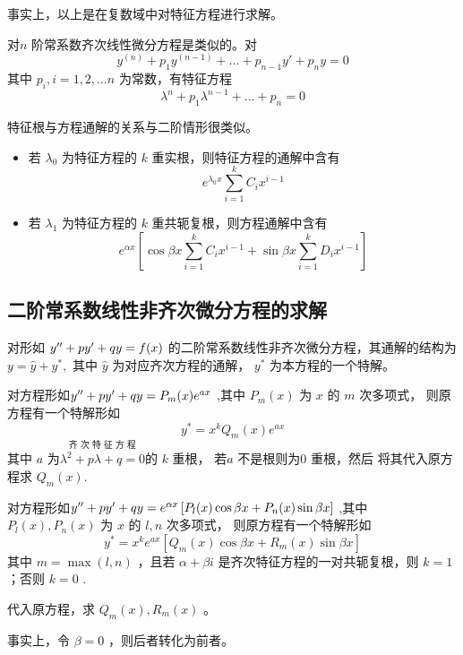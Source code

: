 事实上，以上是在复数域中对特征方程进行求解。

对$ n $ 阶常系数齐次线性微分方程是类似的。对 $$
    y^{(n)} + p_1y^{(n-1)} + \dots + p_{n-1}y' + p_ny = 0
$$ 其中 $ p_i,i=1,2,\dots n  $ 为常数，有特征方程$$
    \lambda^n + p_1\lambda^{n-1} +\dots + p_n = 0
$$ 

特征根与方程通解的关系与二阶情形很类似。

\begin{itemize}
    \item 若 $ \lambda_0 $ 为特征方程的 $ k $ 重实根，则特征方程的通解中含有$$
        e^{\lambda_0 x}\sum_{i=1}^k C_ix^{i-1}
    $$ 
    \item 若 $ \lambda_1 $ 为特征方程的 $ k $ 重共轭复根，则方程通解中含有$$
        e^{\alpha x}\left[
            \cos \beta x \sum_{i=1}^k C_ix^{i-1}+
            \sin \beta x \sum_{i=1}^k D_ix^{i-1}
        \right]
    $$ 
\end{itemize}

\subsection{二阶常系数线性非齐次微分方程的求解}

对形如 $ y^{\prime\prime}+py'+qy = f(x) $ 的二阶常系数线性非齐次微分方程，其通解的结构为
$ y = \hat y  + y^*, $ 其中 $ \hat y $ 为对应齐次方程的通解， $ y^* $ 为本方程的一个特解。

对方程形如$
    y^{\prime\prime} + py'+qy = P_m(x)e^{ax}
$ ,其中 $ P_m(x) $ 为 $ x $ 的 $ m $ 次多项式，
则原方程有一个特解形如$$
    y^* = x^k Q_m(x) e^{ax}
$$ 其中 $ a $ 为$\overset{\textrm{齐\ 次\ 特\ 征\ 方\ 程}}{ \lambda^2 + p\lambda + q = 0  }$的 $ k $ 重根，
若$ a $ 不是根则为$ 0 $ 重根，然后
将其代入原方程求 $ Q_m(x). $

对方程形如$
    y^{\prime\prime} + py'+qy = e^{\alpha x}\left[P_l(x)\cos \beta x+P_n(x)\sin \beta x\right]
$ ,其中 $ P_l(x),P_n(x) $ 为 $ x $ 的 $ l,n $ 次多项式，
则原方程有一个特解形如$$
    y^* = x^ke^{ax}\left[Q_m(x)\cos\beta x+R_m(x)\sin \beta x\right]
$$ 其中 $ m = \max(l,n) $ ，且若 $ \alpha+\beta i $ 是齐次特征方程的一对共轭复根，则 $ k = 1 $ ；否则 $ k = 0 $ .

代入原方程，求 $ Q_m(x),R_m(x) $ 。

事实上，令 $ \beta = 0 $ ，则后者转化为前者。

\begin{comment}
\subsection{欧拉方程}

形如 $\dis x^ny^{(n)} + \sum_{i=1}^np_ix^{n-i}y^{(n-i)} = f(x) $ 的方程为欧拉方程。
令 $ x = e^t $ ，将其转化为以 $ t $ 为自变量的常系数线性方程。

具体而言，若设 $ x = e^t $ ，则有
\begin{equation*}
    \begin{aligned}
        \dfrac{\mathrm{d}y}{\mathrm{d}x} = \dfrac{1}{x}y'_{t};\quad{}
        \dfrac{\mathrm{d}^2y}{\mathrm{d}x^2} = \dfrac{y^\pprime_t - y'_t}{x^2}
    \end{aligned}
\end{equation*}
\end{comment}
